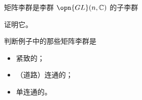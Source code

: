 \begin{theorem}{}
矩阵李群是李群 $\opn{GL}(n, \mathbb{C})$ 的子李群
\end{theorem}

\begin{exercise}{}
证明它。
\end{exercise}

\begin{exercise}{}
判断例子中的那些矩阵李群是
\begin{itemize}
\item 紧致的；
\item （道路）连通的；
\item 单连通的。
\end{itemize}
\end{exercise}

